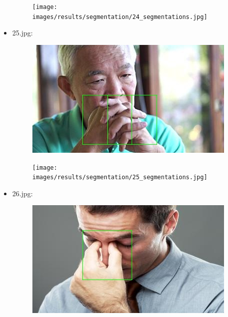\begin{itemize}
\begin{figure}[!htb]
\begin{minipage}{0.5\textwidth}
                \centering
                \texttt{[image: images/results/segmentation/24\_segmentations.jpg]}
            \end{minipage}
        \end{figure}
    \item 25.jpg:
        \begin{figure}[!htb]
            \begin{minipage}{0.5\textwidth}
                \centering
                \includegraphics[scale = 0.68]{images/results/detection/25_detections.jpg}
            \end{minipage}\hfill
            \begin{minipage}{0.5\textwidth}
                \centering
                \texttt{[image: images/results/segmentation/25\_segmentations.jpg]}
            \end{minipage}
        \end{figure}
    \item 26.jpg:
        \begin{figure}[!htb]
            \begin{minipage}{0.5\textwidth}
                \centering
                \includegraphics[scale = 0.68]{images/results/detection/26_detections.jpg}
            \end{minipage}\hfill
            \begin{minipage}{0.5\textwidth}
                \centering

\end{minipage}
\end{figure}
\end{itemize}

